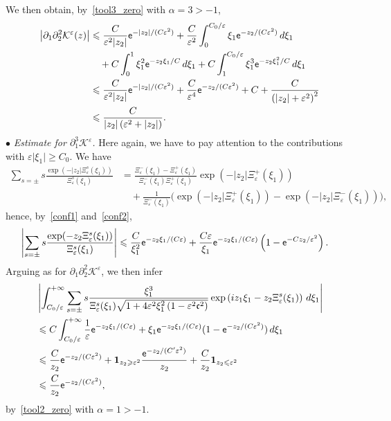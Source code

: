 \documentclass[10pt]{amsart}
\theoremstyle{definition}\newtheorem{defi}[theo]{Definition}\newtheorem{rema}[theo]{Remark}\newtheorem{exam}[theo]{Example}\newtheorem{exem}[theo]{Example}\newtheorem{nota}[theo]{Notation}
\newcommand*\p{\partial}
\newcommand*\BK{\mathcal{K}}
\newcommand{\bfun}{\mathbf{1}}
\newcommand*\ex{{\sf e}}
\newcommand*\cs{{\mathfrak c}}
\newcommand*\ii{\infty}
\newcommand*\gs{\geqslant }
\newcommand*\ls{\leqslant }
\newcommand*\e{\varepsilon}
\renewcommand*\a{\alpha}
\begin{document}
We then obtain, by~\eqref{tool3_zero} with $ \a = 3 > -1 $,
\begin{align*}
\left\lvert \p_1 \p_2^2 \BK^\e (z)\right\rvert &
\ls \frac{C}{\e^2 |z_2| } \ex^{ - |z_2| / (C\e^2) } + \frac{ C}{\e^2} \int_0^{ C_0 / \e } \xi_1 \ex^{- z_2 / (C \e^2) } \, d\xi_1
\\
& \quad + C \int_0^{1} \xi_1^2 \ex^{- z_2 \xi_1 / C } \, d\xi_1 + C \int_1^{ C_0 / \e } \xi_1^3 \ex^{- z_2 \xi_1^2 / C } \, d\xi_1
\\ &
\ls \frac{C}{\e^2 |z_2| } \ex^{ - |z_2| / (C\e^2) } + \frac{C}{\e^4} \ex^{- z_2 / (C \e^2) } + C + \frac{C}{\left(|z_2| + \e^2\right)^2 }
\\ &
\ls \frac{C}{ |z_2| \left(\e^2 + |z_2|\right) }.
\end{align*}
\noindent $ \bullet $ \emph{Estimate for $ \p_1^3 \BK^\e $.} Here again, we have to pay attention to the contributions with $ \e \lvert \xi_1 \rvert \gs C_0 $. We have
\begin{align*}
\sum_{ s = \pm} s \frac{ \exp(-|z_2| \Xi_\e^s (\xi_1)) }{ \Xi_\e^s (\xi_1) } & = \frac{ \Xi_\e^- (\xi_1) - \Xi_\e^+ (\xi_1) }{ \Xi_\e^- (\xi_1) \Xi_\e^+ (\xi_1) } \exp(-|z_2| \Xi_\e^+ (\xi_1))
\\ & \quad + \frac{ 1}{\Xi_\e^- (\xi_1) } \Big(\exp(-|z_2| \Xi_\e^+ (\xi_1)) - \exp(-|z_2| \Xi_\e^- (\xi_1)) \Big),
\end{align*}
hence, by~\eqref{conf1} and~\eqref{conf2},
\begin{align*}
\left\lvert \sum_{ s = \pm} s \frac{ \exp(- z_2 \Xi_\e^s (\xi_1)) }{ \Xi_\e^s (\xi_1) } \right\rvert & \ls \frac{ C}{ \xi_1^2 } \ex^{ - z_2 \xi_1/ (C\e) } + \frac{ C\e}{ \xi_1 } \ex^{ - z_2 \xi_1/ (C\e) }\left(1 - \ex^{ - C z_2 /\e^2}\right).
\end{align*}
Arguing as for $ \p_1\p_2^2 \BK^\e $, we then infer
\begin{align*}
& \left\lvert \int_{C_0 /\e }^{+\ii}
\sum_{ s = \pm} s \frac{ \xi_1^3 }{\Xi_\e^s (\xi_1) \sqrt{1 + 4 \e^2 \xi_1^2 \left(1 - \e^2 \cs^2\right) } }
\exp\left(i z_1 \xi_1 - z_2 \Xi_\e^s (\xi_1)\right) \, d \xi_1 \right\rvert
\\ & \ls C \int_{C_0/ \e}^{+\ii}
\frac{ 1}{ \e } \ex^{ - z_2 \xi_1/ (C\e) } + \xi_1 \ex^{ - z_2 \xi_1/ (C\e) } (1 - \ex^{ - z_2 / (C\e^2) })
\, d \xi_1
\\ & \ls
\frac{ C}{ z_2 } \ex^{ - z_2 / (C\e^2)} + \bfun_{ z_2 \gs \e^2} \frac{ \ex^{- z_2 / (C' \e^2)} }{ z_2} + \frac{C}{ z_2 } \bfun_{ z_2 \ls \e^2}
\\ & \ls
\frac{ C}{ z_2 } \ex^{ - z_2 / (C\e^2)},
\end{align*}
by~\eqref{tool2_zero} with $ \alpha = 1 > -1 $.
\end{document}
